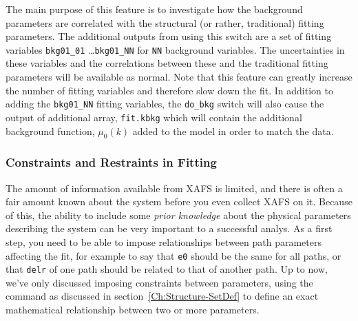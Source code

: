 The main purpose of this feature is to investigate how the background
parameters are correlated with the structural (or rather, traditional)
fitting parameters.  The additional outputs from using this switch are a
set of fitting variables {\tt{bkg01\_01}} \ldots {\tt{bkg01\_NN}} for
{\tt{NN}} background variables.  The uncertainties in these variables and
the correlations between these and the traditional fitting parameters will
be available as normal.  Note that this feature can greatly increase the
number of fitting variables and therefore slow down the fit.  In addition
to adding the {\tt{bkg01\_NN}} fitting variables, the {\tt{do\_bkg}} switch
will also cause the output of additional array, {\tt{fit.kbkg}} which will
contain the additional background function, $\mu_0(k)$ added to the model
in order to match the data.


\subsubsection{Constraints and Restraints in Fitting} \label{Ch:FEFFIT-restraints}

{}
{}

The amount of information available from XAFS is limited, and there is
often a fair amount known about the system before you even collect XAFS on
it.  Because of this, the ability to include some {\emph{prior knowledge}}
about the physical parameters describing the system can be very important
to a successful analys.  As a first step, you need to be able to impose
relationships between path parameters affecting the fit, for example to say
that {\tt{e0}} should be the same for all paths, or that {\tt{delr}} of one
path should be related to that of another path.  Up to now, we've only
discussed imposing constraints between parameters, using the {}
command as discussed in section~\ref{Ch:Structure-SetDef} to define an
exact mathematical relationship between two or more parameters.

